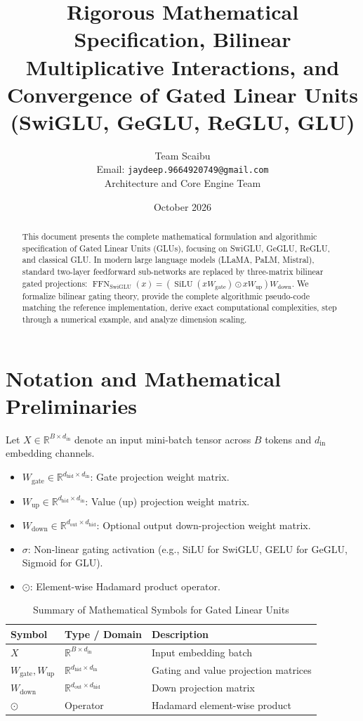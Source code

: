 \documentclass[11pt,a4paper]{article}
\title{\textbf{Rigorous Mathematical Specification, Bilinear Multiplicative Interactions, and Convergence of Gated Linear Units (SwiGLU, GeGLU, ReGLU, GLU)}}
\author{Team Scaibu \\ \small Email: \texttt{jaydeep.9664920749@gmail.com} \\ \small Architecture and Core Engine Team}
\date{October 2026}
\theoremstyle{definition}
\begin{document}
\maketitle

\begin{abstract}
This document presents the complete mathematical formulation and algorithmic specification of Gated Linear Units (GLUs), focusing on SwiGLU, GeGLU, ReGLU, and classical GLU. In modern large language models (LLaMA, PaLM, Mistral), standard two-layer feedforward sub-networks are replaced by three-matrix bilinear gated projections: $\operatorname{FFN}_{\text{SwiGLU}}(x) = (\operatorname{SiLU}(x W_{\text{gate}}) \odot x W_{\text{up}}) W_{\text{down}}$. We formalize bilinear gating theory, provide the complete algorithmic pseudo-code matching the reference implementation, derive exact computational complexities, step through a numerical example, and analyze dimension scaling.
\end{abstract}

\section{Notation and Mathematical Preliminaries}

Let $X \in \mathbb{R}^{B \times d_{\text{in}}}$ denote an input mini-batch tensor across $B$ tokens and $d_{\text{in}}$ embedding channels.

\begin{itemize}
    \item $W_{\text{gate}} \in \mathbb{R}^{d_{\text{hid}} \times d_{\text{in}}}$: Gate projection weight matrix.
    \item $W_{\text{up}} \in \mathbb{R}^{d_{\text{hid}} \times d_{\text{in}}}$: Value (up) projection weight matrix.
    \item $W_{\text{down}} \in \mathbb{R}^{d_{\text{out}} \times d_{\text{hid}}}$: Optional output down-projection weight matrix.
    \item $\sigma$: Non-linear gating activation (e.g., SiLU for SwiGLU, GELU for GeGLU, Sigmoid for GLU).
    \item $\odot$: Element-wise Hadamard product operator.
\end{itemize}

\begin{table}[h]
\centering
\caption{Summary of Mathematical Symbols for Gated Linear Units}
\begin{tabular}{lll}
\toprule
\textbf{Symbol} & \textbf{Type / Domain} & \textbf{Description} \\
\midrule
$X$ & $\mathbb{R}^{B \times d_{\text{in}}}$ & Input embedding batch \\
$W_{\text{gate}}, W_{\text{up}}$ & $\mathbb{R}^{d_{\text{hid}} \times d_{\text{in}}}$ & Gating and value projection matrices \\
$W_{\text{down}}$ & $\mathbb{R}^{d_{\text{out}} \times d_{\text{hid}}}$ & Down projection matrix \\
$\odot$ & Operator & Hadamard element-wise product \\
\bottomrule
\end{tabular}
\end{table}
\end{document}
